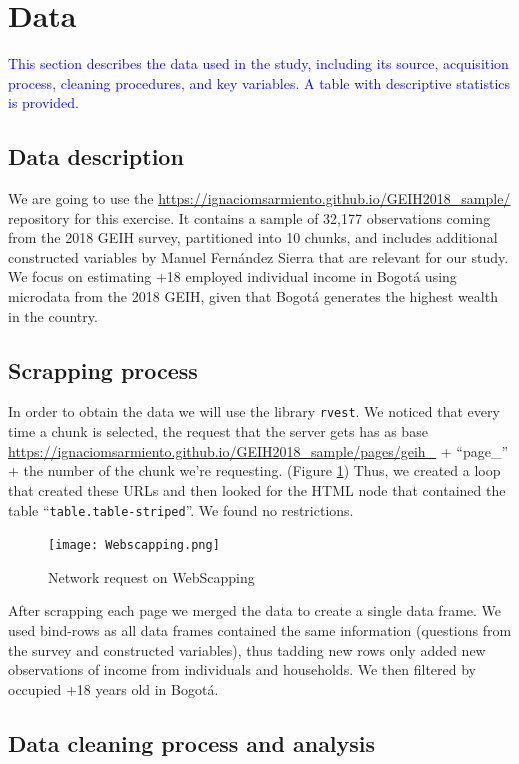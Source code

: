 \documentclass[a4paper,12pt]{article}
\begin{document}
\section{Data}
\textcolor{blue}{This section describes the data used in the study, including its source, acquisition process, cleaning procedures, and key variables. A table with descriptive statistics is provided.}

\subsection{ Data description}
We are going to use the \url{https://ignaciomsarmiento.github.io/GEIH2018_sample/} repository for this exercise. It contains a sample of 32,177 observations coming from the 2018 GEIH survey, partitioned into 10 chunks, and includes additional constructed variables by Manuel Fernández Sierra that are relevant for our study. We focus on estimating +18 employed individual income in Bogotá using microdata from the 2018 GEIH, given that Bogotá generates the highest wealth in the country. 

\subsection{ Scrapping process}
In order to obtain the data we will use the library \texttt{rvest}. We noticed that every time a chunk is selected, the request that the server gets has as base \url{https://ignaciomsarmiento.github.io/GEIH2018_sample/pages/geih_} + ``page\_'' + the number of the chunk we're requesting. (Figure \ref{fig:webscrapping}) Thus, we created a loop that created these URLs and then looked for the HTML node that contained the table ``\texttt{table.table-striped}''. We found no restrictions.

\begin{figure}[H]
    \centering
    \caption{Network request on WebScapping}
    \texttt{[image: Webscapping.png]}
    \label{fig:webscrapping}
\end{figure}

After scrapping each page we merged the data to create a single data frame. We used bind-rows as all data frames contained the same information (questions from the survey and constructed variables), thus tadding new rows only added new observations of income from individuals and households. We then filtered by occupied +18 years old in Bogotá. 

\subsection{ Data cleaning process and analysis}
\end{document}
